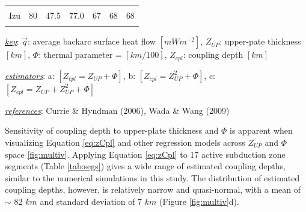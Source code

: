\begin{table}
\begin{threeparttable}
\begin{tabular}[t]{lrrrrrr}
\cellcolor{gray!6}{Kamchatka} & \cellcolor{gray!6}{70} & \cellcolor{gray!6}{80.2} & \cellcolor{gray!6}{77.0} & \cellcolor{gray!6}{89} & \cellcolor{gray!6}{88} & \cellcolor{gray!6}{88}\\
Izu & 80 & 47.5 & 77.0 & 67 & 68 & 68\\
\cellcolor{gray!6}{NE Japan} & \cellcolor{gray!6}{88} & \cellcolor{gray!6}{47.7} & \cellcolor{gray!6}{107.9} & \cellcolor{gray!6}{64} & \cellcolor{gray!6}{65} & \cellcolor{gray!6}{65}\\
\bottomrule
\end{tabular}
\begin{tablenotes}
\item \uline{\textit{key}}: $\vec{q}$: average backarc surface heat flow $[mWm^{-2}]$, $Z_{UP}$: upper-pate thickness $[km]$, $\Phi$: thermal parameter = $[km/100]$, $Z_{cpl}$: coupling depth $[km]$
\item \uline{\textit{estimators}}: a: $[Z_{cpl}=Z_{UP}+\Phi]$, b: $[Z_{cpl}=Z_{UP}^2+\Phi]$, c: $[Z_{cpl}=Z_{UP}+Z_{UP}^2+\Phi]$
\item \uline{\textit{references}}: Currie \& Hyndman (2006), Wada \& Wang (2009)
\end{tablenotes}
\end{threeparttable}
\end{table}

Sensitivity of coupling depth to upper-plate thickness and \(\Phi\) is apparent when visualizing Equation \eqref{eq:zCpl} and other regression models across \(Z_{UP}\) and \(\Phi\) space \ref{fig:multiv}. Applying Equation \eqref{eq:zCpl} to 17 active subduction zone segments (Table \ref{tab:segs}) gives a wide range of estimated coupling depths, similar to the numerical simulations in this study. The distribution of estimated coupling depths, however, is relatively narrow and quasi-normal, with a mean of \(\sim\) 82 \(km\) and standard deviation of 7 \(km\) (Figure \ref{fig:multiv}d).

